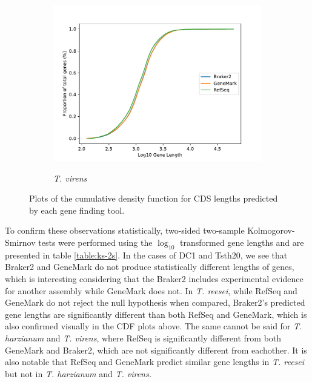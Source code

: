 \begin{figure}
  \ContinuedFloat
  \centering
  \begin{subfigure}{0.7\textwidth}
    \includegraphics[width=\textwidth]{figures/t-virens-cdf-lengths-log.pdf}
    \label{fig:tvirens-lengths}
    \caption{\textit{T. virens}}
  \end{subfigure}
  \caption[Cumulative Density Function of Gene Lengths]{Plots of the
    cumulative density function for CDS lengths predicted by each gene
    finding tool.}
  \label{fig:cdf-lengths}
\end{figure}

To confirm these observations statistically, two-sided two-sample
Kolmogorov-Smirnov tests were performed using the $\log_{10}$
transformed gene lengths and are presented in table
\ref{table:ks-2s}. In the cases of DC1 and Tsth20, we see that Braker2
and GeneMark do not produce statistically different lengths of genes,
which is interesting considering that the Braker2 includes
experimental evidence for another assembly while GeneMark does not. In
\textit{T. reesei}, while RefSeq and GeneMark do not reject the null
hypothesis when compared, Braker2's predicted gene lengths are
significantly different than both RefSeq and GeneMark, which is also
confirmed visually in the CDF plots above. The same cannot be said for
\textit{T. harzianum} and \textit{T. virens}, where RefSeq is
significantly different from both GeneMark and Braker2, which are not
significantly different from eachother. It is also notable that RefSeq
and GeneMark predict similar gene lengths in \textit{T. reesei} but
not in \textit{T. harzianum} and \textit{T. virens.}

